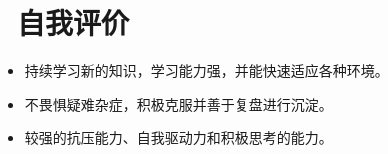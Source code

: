 \documentclass{resume}
\begin{document}





\section{\faBalanceScale\ 自我评价}
\begin{itemize}[itemsep=0.2em]
  \item 持续学习新的知识，学习能力强，并能快速适应各种环境。
  \item 不畏惧疑难杂症，积极克服并善于复盘进行沉淀。
  \item 较强的抗压能力、自我驱动力和积极思考的能力。
\end{itemize}


%
%
\end{document}
